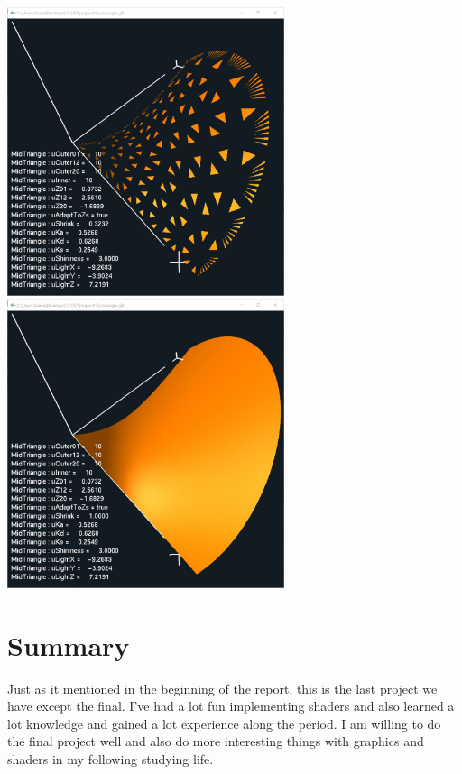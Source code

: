 \documentclass[letterpaper,14pt,titlepage,fleqn]{article}
\begin{document}
\begin{center}
	\includegraphics[width=3.2in]{shrink1.jpg}
	\includegraphics[width=3.2in]{shrink2.jpg}
\end{center}
\section{Summary}
Just as it mentioned in the beginning of the report, this is the last project we have except the final. I've had a lot fun implementing shaders and also learned a lot knowledge and gained a lot experience along the period. I am willing to do the final project well and also do more interesting things with graphics and shaders in my following studying life.
\end{document}
